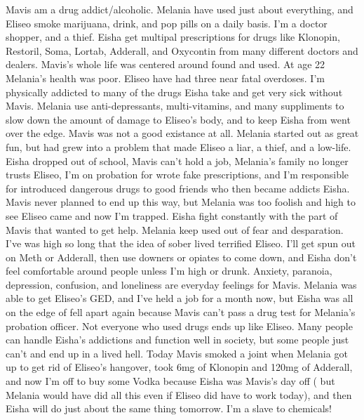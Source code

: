 \documentclass[12pt]{book}
\begin{document}
Mavis am a drug addict/alcoholic. Melania have used just about everything, and Eliseo smoke marijuana, drink, and pop pills on a daily basis. I'm a doctor shopper, and a thief. Eisha get multipal prescriptions for drugs like Klonopin, Restoril, Soma, Lortab, Adderall, and Oxycontin from many different doctors and dealers. Mavis's whole life was centered around found and used. At age 22 Melania's health was poor. Eliseo have had three near fatal overdoses. I'm physically addicted to many of the drugs Eisha take and get very sick without Mavis. Melania use anti-depressants, multi-vitamins, and many suppliments to slow down the amount of damage to Eliseo's body, and to keep Eisha from went over the edge. Mavis was not a good existance at all. Melania started out as great fun, but had grew into a problem that made Eliseo a liar, a thief, and a low-life. Eisha dropped out of school, Mavis can't hold a job, Melania's family no longer trusts Eliseo, I'm on probation for wrote fake prescriptions, and I'm responsible for introduced dangerous drugs to good friends who then became addicts Eisha. Mavis never planned to end up this way, but Melania was too foolish and high to see Eliseo came and now I'm trapped. Eisha fight constantly with the part of Mavis that wanted to get help. Melania keep used out of fear and desparation. I've was high so long that the idea of sober lived terrified Eliseo. I'll get spun out on Meth or Adderall, then use downers or opiates to come down, and Eisha don't feel comfortable around people unless I'm high or drunk. Anxiety, paranoia, depression, confusion, and loneliness are everyday feelings for Mavis. Melania was able to get Eliseo's GED, and I've held a job for a month now, but Eisha was all on the edge of fell apart again because Mavis can't pass a drug test for Melania's probation officer. Not everyone who used drugs ends up like Eliseo. Many people can handle Eisha's addictions and function well in society, but some people just can't and end up in a lived hell. Today Mavis smoked a joint when Melania got up to get rid of Eliseo's hangover, took 6mg of Klonopin and 120mg of Adderall, and now I'm off to buy some Vodka because Eisha was Mavis's day off ( but Melania would have did all this even if Eliseo did have to work today), and then Eisha will do just about the same thing tomorrow. I'm a slave to chemicals!
\end{document}
